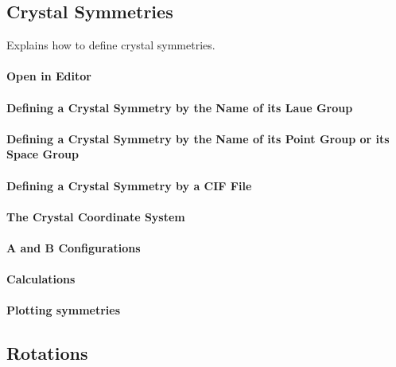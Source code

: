 \documentclass{article}
\begin{document}
		\subsection{Crystal Symmetries}

		
                     \begin{par}
Explains how to define crystal symmetries.
\end{par} \vspace{1em}

                  
			\paragraph{Open in Editor}
		
			\paragraph{Defining a Crystal Symmetry by the Name of its Laue Group}
		
			\paragraph{Defining a Crystal Symmetry by the Name of its Point Group or its Space Group}
		
			\paragraph{Defining a Crystal Symmetry by a CIF File}
		
			\paragraph{The Crystal Coordinate System}
		
			\paragraph{A and B Configurations}
		
			\paragraph{Calculations}
		
			\paragraph{Plotting symmetries}
		
		\subsection{Rotations}
\end{document}
